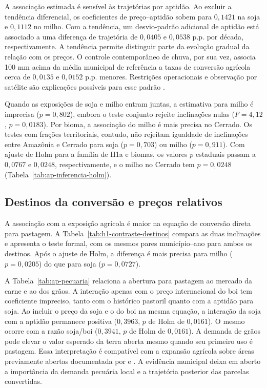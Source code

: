 
\FloatBarrier

A associação estimada é sensível às trajetórias por aptidão. Ao excluir a tendência diferencial, os coeficientes de preço--aptidão sobem para $0{,}1421$ na soja e $0{,}1112$ no milho. Com a tendência, um desvio-padrão adicional de aptidão está associado a uma diferença de trajetória de $0{,}0405$ e $0{,}0538$ p.p. por década, respectivamente. A tendência permite distinguir parte da evolução gradual da relação com os preços. O controle contemporâneo de chuva, por sua vez, associa 100 mm acima da média municipal de referência a taxas de conversão agrícola cerca de $0{,}0135$ e $0{,}0152$ p.p. menores. Restrições operacionais e observação por satélite são explicações possíveis para esse padrão \cite{ChomitzThomas2003, AssuncaoEtAl2023}.

Quando as exposições de soja e milho entram juntas, a estimativa para milho é imprecisa ($p=0{,}802$), embora o teste conjunto rejeite inclinações nulas ($F=4{,}12$, $p=0{,}0183$). Por bioma, a associação do milho é mais precisa no Cerrado. Os testes com frações territoriais, contudo, não rejeitam igualdade de inclinações entre Amazônia e Cerrado para soja ($p=0{,}703$) ou milho ($p=0{,}911$). Com ajuste de Holm para a família de H1a e biomas, os valores $p$ estaduais passam a $0{,}0767$ e $0{,}0248$, respectivamente, e o milho no Cerrado tem $p=0{,}0248$ (Tabela~\ref{tab:ap-inferencia-holm}).

\subsection{Destinos da conversão e preços relativos}
\label{discussao-destinos-robustez}

A associação com a exposição agrícola é maior na equação de conversão direta para pastagem. A Tabela~\ref{tab:h1-contraste-destinos} compara as duas inclinações e apresenta o teste formal, com os mesmos pares município--ano para ambos os destinos. Após o ajuste de Holm, a diferença é mais precisa para milho ($p=0{,}0205$) do que para soja ($p=0{,}0727$).


\FloatBarrier

A Tabela~\ref{tab:ap-pecuaria} relaciona a abertura para pastagem ao mercado da carne e ao dos grãos. A interação apenas com o preço internacional do boi tem coeficiente impreciso, tanto com o histórico pastoril quanto com a aptidão para soja. Ao incluir o preço da soja e o do boi na mesma equação, a interação da soja com a aptidão permanece positiva ($0{,}3963$, $p$ de Holm de $0{,}0161$). O mesmo ocorre com a razão soja/boi ($0{,}3941$, $p$ de Holm de $0{,}0161$). A demanda de grãos pode elevar o valor esperado da terra aberta mesmo quando seu primeiro uso é pastagem. Essa interpretação é compatível com a expansão agrícola sobre áreas previamente abertas documentada por  e . A evidência municipal deixa em aberto a importância da demanda pecuária local e a trajetória posterior das parcelas convertidas.

